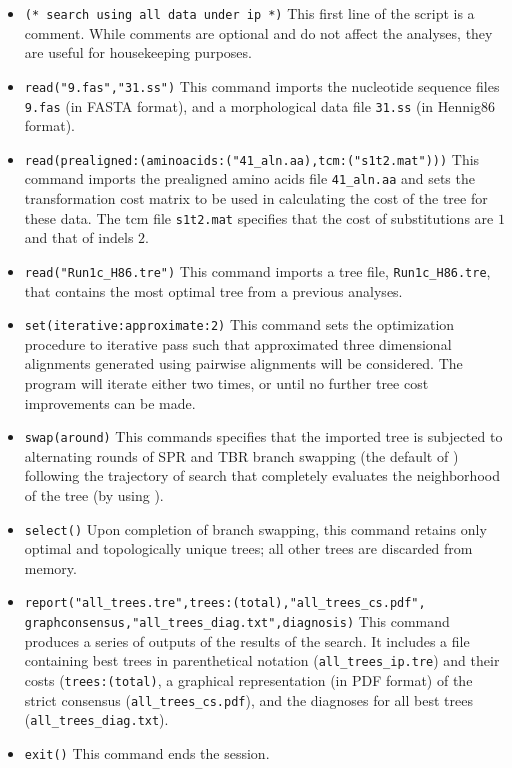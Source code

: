 \begin{itemize}
\item \texttt{(* search using all data under ip *)} This first line of the script is a comment. While comments are 
optional and do not affect the analyses, they are useful for housekeeping purposes.
\item \texttt{read("9.fas","31.ss")} This command imports the nucleotide sequence files \texttt{9.fas} (in FASTA 
format), and a morphological data file \texttt{31.ss} (in Hennig86 format).
\item \texttt{read(prealigned:(aminoacids:("41\_aln.aa),tcm:("s1t2.mat")))} This command imports the prealigned
amino acids file \texttt{41\_aln.aa} and sets the transformation cost matrix to be used in calculating the cost of the tree
for these data.  The tcm file \texttt{s1t2.mat} specifies that the cost of substitutions are $1$ and that of indels $2$.
\item \texttt{read("Run1c\_H86.tre")} This command imports a tree file, \texttt{Run1c\_H86.tre}, that contains the most 
optimal tree from a previous analyses. 
\item \texttt{set(iterative:approximate:2)} This command sets the optimization procedure to iterative pass such 
that approximated three dimensional alignments generated using pairwise alignments will be considered.  
The program will iterate either two times, or until no further tree cost improvements can be made.
\item \texttt{swap(around)} This commands specifies that the imported tree is subjected to alternating rounds of SPR 
and TBR branch swapping (the default of \poy) following the trajectory of search that completely 
evaluates the neighborhood of the tree (by using ).
\item \texttt{select()} Upon completion of branch swapping, this command retains only optimal and topologically 
unique trees; all other trees are discarded from memory.
\item \texttt{report("all\_trees.tre",trees:(total),"all\_trees\_cs.pdf",\\graphconsensus,"all\_trees\_diag.txt",diagnosis)} 
This command produces a series of outputs of the results of the search. It includes a file containing best trees in parenthetical 
notation (\texttt{all\_trees\_ip.tre}) and their costs (\texttt{trees:(total)}, a graphical representation (in PDF format) of the strict 
consensus (\texttt{all\_trees\_cs.pdf}), and the diagnoses for all best trees (\texttt{all\_trees\_diag.txt}).
\item \texttt{exit()} This command ends the \poy session.
\end{itemize}

